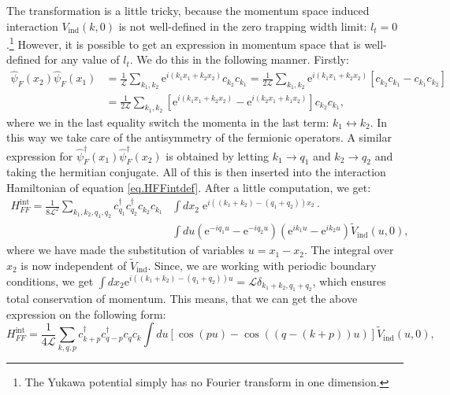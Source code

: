 The transformation is a little tricky, because the momentum space induced interaction $V_{\text{ind}}(k, 0)$ is not well-defined in the zero trapping width limit: $l_t = 0$.\footnote{The Yukawa potential simply has no Fourier transform in one dimension.} However, it is possible to get an expression in momentum space that is well-defined for any value of $l_t$. We do this in the following manner. Firstly:
\begin{align}
\hat{\psi}_F(x_2) \hat{\psi}_F(x_1) &= \frac{1}{\mathcal{L}}\sum_{k_1,k_2} \text{e}^{i(k_1x_1 + k_2x_2)} c_{k_2}c_{k_1} = \frac{1}{2\mathcal{L}}\sum_{k_1,k_2} \text{e}^{i(k_1x_1 + k_2x_2)} \left[c_{k_2}c_{k_1} - c_{k_1}c_{k_2}\right] \nonumber \\
&= \frac{1}{2\mathcal{L}}\sum_{k_1,k_2} \left[\text{e}^{i(k_1x_1 + k_2x_2)} - \text{e}^{i(k_2x_1 + k_1x_2)}\right]c_{k_2}c_{k_1}, \nonumber
\end{align}
where we in the last equality switch the momenta in the last term: $k_1 \leftrightarrow k_2$. In this way we take care of the antisymmetry of the fermionic operators. A similar expression for $\hat{\psi}^\dagger_F(x_1)\hat{\psi}^\dagger_F(x_2)$ is obtained by letting $k_1 \to q_1$ and $k_2 \to q_2$ and taking the hermitian conjugate. All of this is then inserted into the interaction Hamiltonian of equation \eqref{eq.HFFintdef}. After a little computation, we get:
\begin{align}
H^\text{int}_{FF} = \frac{1}{8\mathcal{L}^2} \sum_{k_1,k_2,q_1,q_2} c^\dagger_{q_1}c^\dagger_{q_2}c_{k_2}c_{k_1} & \int dx_2 \; \text{e}^{i((k_1+k_2)-(q_1+q_2))x_2}\cdot \nonumber \\ 
&\int du\left(\text{e}^{-iq_1u} - \text{e}^{-iq_2u}\right)\left(\text{e}^{ik_1u} - \text{e}^{ik_2u}\right)\tilde{V}_\text{ind}(u,0), \nonumber
\end{align}
where we have made the substitution of variables $u = x_1 - x_2$. The integral over $x_2$ is now independent of $\tilde{V}_{\text{ind}}$. Since, we are working with periodic boundary conditions, we get $\int dx_2 \text{e}^{i((k_1+k_2)-(q_1+q_2))u} = \mathcal{L}\delta_{k_1+k_2,q_1+q_2}$, which ensures total conservation of momentum. This means, that we can get the above expression on the following form: 
\begin{equation}
H^\text{int}_{FF} = \frac{1}{4\mathcal{L}} \sum_{k,q,p} c^\dagger_{k+p}c^\dagger_{q-p}c_{q}c_{k} \int du\left[\cos\left(pu\right) - \cos\left(\left(q-\left(k+p\right)\right)u\right)\right]\tilde{V}_{\text{ind}}(u,0), \nonumber
\end{equation}
